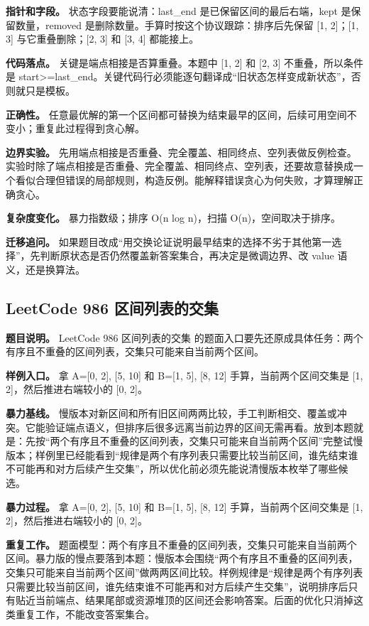 \textbf{指针和字段。} 状态字段要能说清：last\_end 是已保留区间的最后右端，kept 是保留数量，removed 是删除数量。手算时按这个协议跟踪：排序后先保留 [1, 2]；[1, 3] 与它重叠删除；[2, 3] 和 [3, 4] 都能接上。

\textbf{代码落点。} 关键是端点相接是否算重叠。本题中 [1, 2] 和 [2, 3] 不重叠，所以条件是 start>=last\_end。关键代码行必须能逐句翻译成“旧状态怎样变成新状态”，否则就只是模板。

\textbf{正确性。} 任意最优解的第一个区间都可替换为结束最早的区间，后续可用空间不变小；重复此过程得到贪心解。

\textbf{边界实验。} 先用端点相接是否重叠、完全覆盖、相同终点、空列表做反例检查。实验时除了端点相接是否重叠、完全覆盖、相同终点、空列表，还要故意替换成一个看似合理但错误的局部规则，构造反例。能解释错误贪心为何失败，才算理解正确贪心。

\textbf{复杂度变化。} 暴力指数级；排序 O(n log n)，扫描 O(n)，空间取决于排序。

\textbf{迁移追问。} 如果题目改成“用交换论证说明最早结束的选择不劣于其他第一选择”，先判断原状态是否仍然覆盖新答案集合，再决定是微调边界、改 value 语义，还是换算法。

\subsection{LeetCode 986 区间列表的交集}

\textbf{题目说明。} LeetCode 986 区间列表的交集 的题面入口要先还原成具体任务：两个有序且不重叠的区间列表，交集只可能来自当前两个区间。

\textbf{样例入口。} 拿 A=[0, 2], [5, 10] 和 B=[1, 5], [8, 12] 手算，当前两个区间交集是 [1, 2]，然后推进右端较小的 [0, 2]。

\textbf{暴力基线。} 慢版本对新区间和所有旧区间两两比较，手工判断相交、覆盖或冲突。它能验证端点语义，但排序后很多远离当前边界的区间无需再看。放到本题就是：先按“两个有序且不重叠的区间列表，交集只可能来自当前两个区间”完整试慢版本；样例里已经能看到“规律是两个有序列表只需要比较当前区间，谁先结束谁不可能再和对方后续产生交集”，所以优化前必须先能说清慢版本枚举了哪些候选。

\textbf{暴力过程。} 拿 A=[0, 2], [5, 10] 和 B=[1, 5], [8, 12] 手算，当前两个区间交集是 [1, 2]，然后推进右端较小的 [0, 2]。

\textbf{重复工作。} 题面模型：两个有序且不重叠的区间列表，交集只可能来自当前两个区间。暴力版的慢点要落到本题：慢版本会围绕“两个有序且不重叠的区间列表，交集只可能来自当前两个区间”做两两区间比较。样例规律是“规律是两个有序列表只需要比较当前区间，谁先结束谁不可能再和对方后续产生交集”，说明排序后只有贴近当前端点、结果尾部或资源堆顶的区间还会影响答案。后面的优化只消掉这类重复工作，不能改变答案集合。

